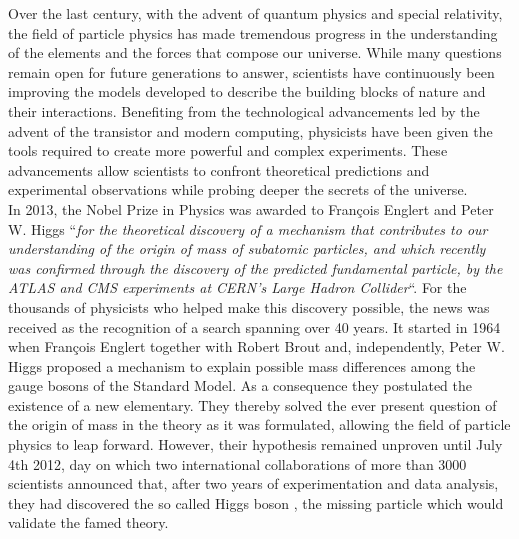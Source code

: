 Over the last century, with the advent of quantum physics and special relativity, the field of particle physics has made tremendous progress in the understanding of the elements and the forces that compose our universe. While many questions remain open for future generations to answer, scientists have continuously been improving the models developed to describe the building blocks of nature and their interactions. Benefiting from the technological advancements led by the advent of the transistor and modern computing, physicists have been given the tools required to create more powerful and complex experiments. These advancements allow scientists to confront theoretical predictions and experimental observations while probing deeper the secrets of the universe. \\

In 2013, the Nobel Prize in Physics was awarded to Fran\c{c}ois Englert and Peter W. Higgs ``\textit{for the theoretical discovery of a mechanism that contributes to our understanding of the origin of mass of subatomic particles, and which recently was confirmed through the discovery of the predicted fundamental particle, by the ATLAS and CMS experiments at CERN's Large Hadron Collider}``. For the thousands of physicists who helped make this discovery possible, the news was received as the recognition of a search spanning over 40 years. It started in 1964 when Fran\c{c}ois Englert together with Robert Brout \cite{PhysRevLett.13.321} and, independently, Peter W. Higgs \cite{PhysRevLett.13.508} proposed a mechanism to explain possible mass differences among the gauge bosons of the Standard Model. As a consequence they postulated the existence of a new elementary. They thereby solved the ever present question of the origin of mass in the theory as it was formulated, allowing the field of particle physics to leap forward. However, their hypothesis remained unproven until July 4th 2012, day on which two international collaborations of more than 3000 scientists announced that, after two years of experimentation and data analysis, they had discovered the so called Higgs boson \cite{PhysRevLett.114.191803}, the missing particle which would validate the famed theory. \\

